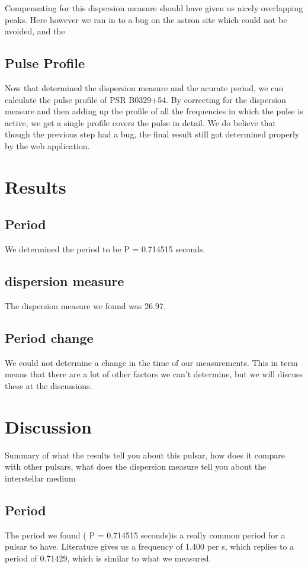 \documentclass[twoside,twocolumn]{article}
\begin{document}
			
	Compensating for this dispersion measure should have given us nicely overlapping peaks. Here however we ran in to a bug on the astron site which could not be avoided, and the 
	
	\subsection{Pulse Profile}
	Now that determined the dispersion measure and the acurate period, we can calculate the pulse profile of PSR B0329+54. By correcting for the dispersion measure and then adding up the profile of all the frequencies in which the pulse is active, we get a single profile covers the pulse in detail. We do believe that though the previous step had a bug, the final result still got determined properly by the web application.

		
	
	

	\section{Results}
	\subsection{Period}
	We determined the period to be P = 0.714515 seconds.
	\subsection{dispersion measure}
	The dispersion measure we found was 26.97.
	
	\subsection{Period change}
	We could not determine a change in the time of our measurements. This in term means that there are a lot of other factors we can't determine, but we will discuss these at the discussions.
	
	
	\section{Discussion}
	Summary of what the results tell you about this pulsar, how does it compare with other
	pulsars, what does the dispersion measure tell you about the interstellar medium
	\subsection{Period}
	The period we found ( P = 0.714515 seconds)is a really common period for a pulsar to have. \cite{Wielebinski} Literature gives us a frequency of 1.400 per s, which replies to a period of 0.71429, which is similar to what we measured. \cite{Hobbs} 
	
\end{document}
